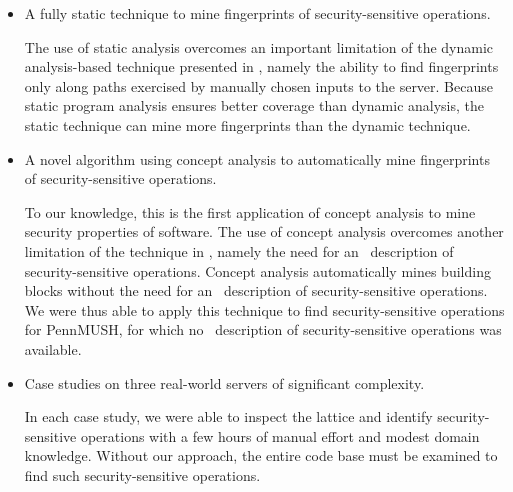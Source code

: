 \begin{itemize}
%
\item A fully static technique to mine fingerprints of security-sensitive
operations. 

The use of static analysis overcomes an important limitation of the
dynamic analysis-based technique presented in , namely
the ability to find fingerprints only along paths exercised by manually chosen
inputs to the server. Because static program analysis ensures better coverage
than dynamic analysis, the static technique can mine more fingerprints than the
dynamic technique.
%
\item A novel algorithm using concept analysis to automatically mine
fingerprints of security-sensitive operations.  

To our knowledge, this is the first application of concept analysis to mine
security properties of software.  The use of concept analysis overcomes another
limitation of the technique in , namely the need for
an \apriori\ description of security-sensitive operations.  Concept analysis
automatically mines building blocks without the need for an \apriori\
description of security-sensitive operations. We were thus able to apply this
technique to find security-sensitive operations for PennMUSH, for which no
\apriori\ description of security-sensitive operations was available.
%
\item Case studies on three real-world servers of significant complexity.  

In each case study, we were able to inspect the lattice and identify
security-sensitive operations with a few hours of manual effort and modest
domain knowledge.  Without our approach, the entire code base must be examined
to find such security-sensitive operations. 
%
\end{itemize}


